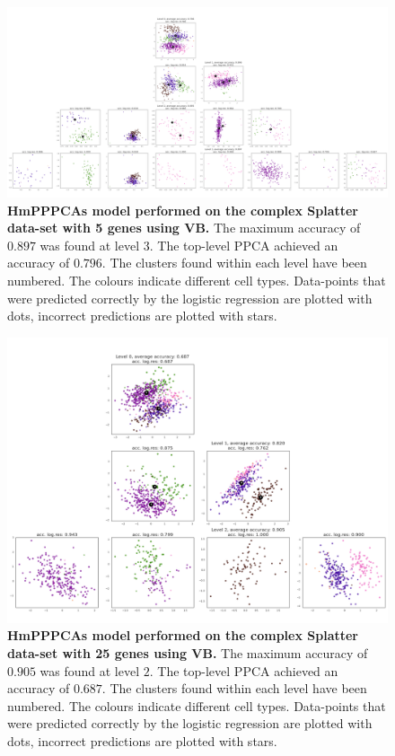 \begin{figure}
    \centering
    \includegraphics[width=\linewidth]{figs/complex_5_vb.png}
    \caption[HmPPPCAs model performed on the complex Splatter data-set with 5 genes using VB]{\small \textbf{HmPPPCAs model performed on the complex Splatter data-set with 5 genes using VB.} \small The maximum accuracy of $0.897$ was found at level $3$. The top-level PPCA achieved an accuracy of $0.796$. The clusters found within each level have been numbered. The colours indicate different cell types. Data-points that were predicted correctly by the logistic regression are plotted with dots, incorrect predictions are plotted with stars.}
    \label{fig:complex_5_vb}
\end{figure}

\begin{figure}
    \centering
    \includegraphics[width=\linewidth]{figs/complex_25_vb.png}
    \caption[HmPPPCAs model performed on the complex Splatter data-set with 25 genes using VB]{\small \textbf{HmPPPCAs model performed on the complex Splatter data-set with 25 genes using VB.} \small The maximum accuracy of $0.905$ was found at level $2$. The top-level PPCA achieved an accuracy of $0.687$. The clusters found within each level have been numbered. The colours indicate different cell types. Data-points that were predicted correctly by the logistic regression are plotted with dots, incorrect predictions are plotted with stars.}
    \label{fig:complex_25_vb}
\end{figure}

